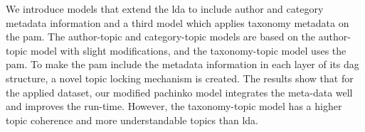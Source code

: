We introduce models that extend the \gls{lda} to include author and category metadata information and a third model which applies taxonomy metadata on the \gls{pam}.
The author-topic and category-topic models are based on the author-topic model with slight modifications, and the taxonomy-topic model uses the \gls{pam}.
To make the \gls{pam} include the metadata information in each layer of its \gls{dag} structure, a novel topic locking mechanism is created.
The results show that for the applied dataset, our modified pachinko model integrates the meta-data well and improves the run-time.
However, the taxonomy-topic model has a higher topic coherence and more understandable topics than \gls{lda}.
